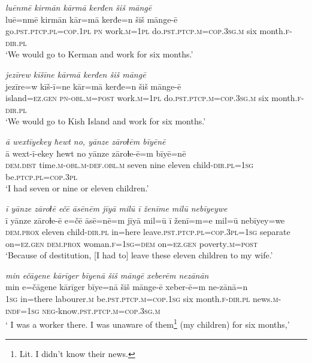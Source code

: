\ea \label{ŽM.24}
\textit{luēnmē kirmān kārmā kerđen šiš māngē} \\ 
\gll luē=nmē kirmān kār=mā kerđe=n šiš mānge-ē \\ 
 go\textsc{.pst}\textsc{.ptcp}\textsc{.pl}\textsc{=cop}\textsc{.\textsc{1pl}} \textsc{pn} work\textsc{.m}\textsc{=\textsc{1pl}} do\textsc{.pst}\textsc{.ptcp}\textsc{.m}\textsc{=cop}\textsc{.3sg}\textsc{.m} six month\textsc{.f}\textsc{-dir}\textsc{.pl} \\ 
\glt `We would go to Kerman and work for six months.'
\z 
 
\ea \label{ŽM.25}
\textit{jezīrew kīšīne kārmā kerđen šiš māngē} \\ 
\gll jezīre=w kīš-ī=ne kār=mā kerđe=n šiš mānge-ē \\ 
 island\textsc{=ez.gen} \textsc{pn}\textsc{-obl}\textsc{.m}\textsc{=\textsc{post}} work\textsc{.m}\textsc{=\textsc{1pl}} do\textsc{.pst}\textsc{.ptcp}\textsc{.m}\textsc{=cop}\textsc{.3sg}\textsc{.m} six month\textsc{.f}\textsc{-dir}\textsc{.pl} \\ 
\glt `We would go to Kish Island and work for six months.'
\z 
 
\ea \label{ŽM.26}
\textit{ā wextīyekey ħewt no, yānze zāroɫēm bīyēnē} \\ 
\gll ā wext-ī-ekey ħewt no yānze zāroɫe-ē=m bīyē=nē \\ 
 \textsc{dem.dist} time\textsc{.m}\textsc{-obl}\textsc{.m}\textsc{-def}\textsc{.obl}\textsc{.m} seven nine eleven child\textsc{-dir}\textsc{.pl}\textsc{=\textsc{1sg}} be\textsc{.ptcp}\textsc{.pl}\textsc{=cop}\textsc{.3pl} \\ 
\glt `I had seven or nine or eleven children.'
\z 
 
\ea \label{ŽM.27}
\textit{ī yānze zāroɫē ečē āsēnēm jīyā milū ī ženīme milū nebīyeywe} \\ 
\gll ī yānze zāroɫe-ē e=čē āsē=nē=m jīyā mil=ū ī ženī=m=e mil=ū nebīyey=we \\ 
 \textsc{dem.prox} eleven child\textsc{-dir}\textsc{.pl} in=here leave\textsc{.pst}\textsc{.ptcp}\textsc{.pl}\textsc{=cop}\textsc{.3pl}\textsc{=\textsc{1sg}} separate on\textsc{=ez.gen} \textsc{dem.prox} woman\textsc{.f}\textsc{=\textsc{1sg}}\textsc{=dem} on\textsc{=ez.gen} poverty\textsc{.m}\textsc{=\textsc{post}} \\ 
\glt `Because of destitution, [I had to] leave these eleven children to my wife.'
\z 
 
\ea \label{ŽM.28}
\textit{min ečāgene kārīger bīyenā šiš māngē xeberēm nezānān} \\ 
\gll min e=čāgene kārīger bīye=nā šiš mānge-ē xeber-ē=m ne-zānā=n \\ 
 \textsc{1sg} in=there labourer\textsc{.m} be\textsc{.pst}\textsc{.ptcp}\textsc{.m}\textsc{=cop}\textsc{.\textsc{1sg}} six month\textsc{.f}\textsc{-dir}\textsc{.pl} news\textsc{.m}\textsc{-indf}\textsc{=\textsc{1sg}} \textsc{neg-}know\textsc{.pst}\textsc{.ptcp}\textsc{.m}\textsc{=cop}\textsc{.3sg}\textsc{.m} \\ 
\glt ` I was a worker there. I was unaware of them\footnote{Lit. I didn’t know their news.}  (my children) for six months,'
\z 
 
